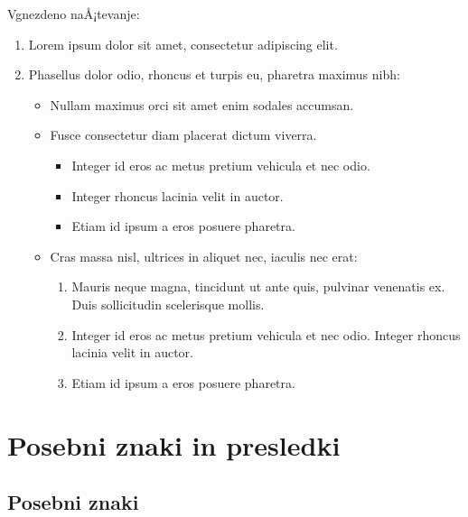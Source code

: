 \documentclass[a4paper]{article}
\begin{document}
Vgnezdeno naÅ¡tevanje:
%
\begin{enumerate}
\item Lorem ipsum dolor sit amet, consectetur adipiscing elit.
\item Phasellus dolor odio, rhoncus et turpis eu, pharetra maximus nibh:
  \begin{itemize}
  \item Nullam maximus orci sit amet enim sodales accumsan.
  \item Fusce consectetur diam placerat dictum viverra.
    \begin{itemize}
    \item Integer id eros ac metus pretium vehicula et nec odio.
    \item Integer rhoncus lacinia velit in auctor.
    \item Etiam id ipsum a eros posuere pharetra.
    \end{itemize}
  \item Cras massa nisl, ultrices in aliquet nec, iaculis nec erat:
    \begin{enumerate}
    \item Mauris neque magna, tincidunt ut ante quis, pulvinar venenatis ex. Duis
      sollicitudin scelerisque mollis.
    \item Integer id eros ac metus pretium vehicula et nec odio. Integer rhoncus lacinia
      velit in auctor.
    \item Etiam id ipsum a eros posuere pharetra.
    \end{enumerate}
  \end{itemize}
\end{enumerate}

\section{Posebni znaki in presledki}

\subsection{Posebni znaki}
\end{document}
